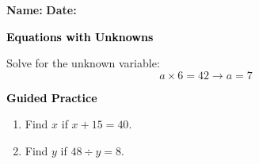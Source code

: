 \documentclass[12pt, letterpaper, fleqn]{article}
\begin{document}
\textbf{Name:} \underline{\hspace{5cm}}
\hfill
\textbf{Date:} \underline{\hspace{3cm}}\\

\begin{tcolorbox}[colback=customteal!20]
    \large\textcolor{black}{\textbf{Equations with Unknowns}}
\end{tcolorbox}
\vspace{3mm}
Solve for the unknown variable:
\[
a \times 6 = 42 \rightarrow a = 7
\]
\newpage
\begin{tcolorbox}[colback=customteal!20]
    \large\textcolor{black}{\textbf{Guided Practice}}
\end{tcolorbox}
\begin{enumerate}[itemsep=3.5cm, leftmargin=0.6cm]
\item Find $x$ if $x + 15 = 40$.
\vspace{3cm}
\item Find $y$ if $48 \div y = 8$.
\end{enumerate}
\end{document}
